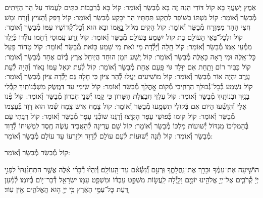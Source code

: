 \documentclass[twoside, openany, parskip=half, 11pt]{book}
\begin{document}
\begin{small}
אֹֽמֶץ יֶשְׁעֲךָ בָּא קוֹל דּוֹדִי הִנֵּה זֶה בָּא מְ֯בַשֵּׂר וְ֯אוֹמֵר:
קוֹל בָּא בְּ֯רִבֲבוֹת כִּתִּים לַעֲמוֹד עַל הַר הַזֵּיתִים מְ֯בַשֵּׂר וְ֯אוֹמֵר:
קוֹל גִּשְׁתּוֹ בַּשּׁוֹפָר לִתְקַע תַּחְתָּיו הַר יִבָּקַע מְ֯בַשֵּׂר וְ֯אוֹמֵר:
קוֹל דָּפַק וְ֯הֵצִיץ וְ֯זָרַח וּמָשׁ חֲצִי הָהָר מִמִּזְרָח מְ֯בַשֵּׂר וְ֯אוֹמֵר:
קוֹל הֵקִים מִלּוּל נׇׇׇׇאֳמוֹ וּבָא הוּא וְ֯כׇל־קְ֯דוֹשָׁיו עִמּוֹ מְ֯בַשֵּׂר וְ֯אוֹמֵר:
קוֹל וּלְכׇל־בָּאֵי הָעוֹלָם בַּת קוֹל יִשָּׁמַע בָּעוֹלָם מְ֯בַשֵּׂר וְ֯אוֹמֵר:
קוֹל זֶֽרַע עֲמוּסֵי רְ֯חָמוֹ נוֹלְ֯דוּ כְּ֯יֶֽלֶד מִמְּ֯עֵי אִמּוֹ מְ֯בַשֵּׂר וְ֯אוֹמֵר:
קוֹל חָֽלָה וְ֯יָלְ֯דָה מִי זֹאת מִי שָׁמַע כָּזֹאת מְ֯בַשֵּׂר וְ֯אוֹמֵר:
קוֹל טָהוֹר פָּעַל כׇּל־אֵֽלֶּה וּמִי רָאָה כָּאֵלֶּה מְ֯בַשֵּׂר וְ֯אוֹמֵר:
קוֹל יֶֽשַׁע וּזְמַן הוּחַד הֲיֽוּחַל אֶֽרֶץ בְּ֯יוֹם אֶחָד מְ֯בַשֵּׂר וְ֯אוֹמֵר:
קוֹל כַּבִּיר רוֹם וָתַֽחַת אִם יִוָּלֵד גּוֹי פַּֽעַם אֶחָת מְ֯בַשֵּׂר וְ֯אוֹמֵר:
קוֹל לְ֯עֵת יִגְאַל עַמּוֹ נָאוֹר וְ֯הָיָה לְ֯עֵת עֶֽרֶב יִהְיֶה אוֹר מְ֯בַשֵּׂר וְ֯אוֹמֵר:
קוֹל מוֹשִׁיעִים יַעֲלוּ לְ֯הַר צִיּוֹן כִּי חָלָה גַּם יָלְ֯דָה צִיּוֹן מְ֯בַשֵּׂר וְ֯אוֹמֵר:
קוֹל נִשְׁמַע בְּ֯כׇל־גְּ֯בוּלֵךְ הַרְחִֽיבִי מְ֯קוֹם אׇׇׇׇׇׇהֳלֵךְ מְ֯בַשֵּׂר וְ֯אוֹמֵר:
קוֹל שִֽׂימִי עַד דַּמֶּֽשֶׂק מִשְׁכְּ֯נוֹתַֽיִךְ קַבְּ֯לִי בָנַֽיִךְ וּבְנוֹתַֽיִךְ מְ֯בַשֵּׂר וְ֯אוֹמֵר:
קוֹל עִלְזִי חֲבַצֶּֽלֶת הַשָּׁרוֹן כִּי קָֽמוּ יְ֯שֵׁנֵי חֶבְרוֹן מְ֯בַשֵּׂר וְ֯אוֹמֵר:
קוֹל פְּ֯נוּ אֵלַי וְ֯הִוָּשְׁ֯עוּ הַיּוֹם אִם בְּ֯קוֹלִי תִשְׁמָֽעוּ מְ֯בַשֵּׂר וְ֯אוֹמֵר:
קוֹל צָמַח אִישׁ צֶֽמַח שְׁ֯מוֹ הוּא דָוִד בְּ֯עַצְמוֹ מְ֯בַשֵּׂר וְ֯אוֹמֵר:
קוֹל קֽוּמוּ כְּ֯פוּשֵׁי עָפָר הָקִֽיצוּ וְ֯רַנֲּנוּ שׁוֹכְ֯נֵי עָפָר מְ֯בַשֵּׂר וְ֯אוֹמֵר:
קוֹל רַבָּֽתִי עָם בְּ֯הַמְלִיכוֹ מִגְדּוֹל יְ֯שׁוּעוֹת מַלְכּוֹ מְ֯בַשֵּׂר וְ֯אוֹמֵר:
קוֹל שֵׁם עֲדִינָה לְ֯הַאֲבִיד עֹֽשֶׂה חֶֽסֶד לִמְשִׁיחוֹ לְ֯דָוִד מְ֯בַשֵּׂר וְ֯אוֹמֵר:
קוֹל תְּ֯נָה יְ֯שׁוּעוֹת לְ֯עַם עוֹלָם לְ֯דָוִד וּלְזַרְעוֹ עַד עוֹלָם מְ֯בַשֵּׂר וְ֯אוֹמֵר:

\end{small}

\begin{large}
קוֹל מְ֯בַשֵּׂר מְ֯בַשֵּׂר וְ֯אוֹמֵר:

\end{large}

הוֹשִׁ֤יעָה אֶת־עַמֶּ֗ךָ וּבָרֵ֥ךְ אֶת־נַֽחֲלָתֶ֑ךָ וּֽרְעֵ֥ם וְ֯֝נַשְּׂ֯אֵ֗ם עַד־הָֽעוֹלָֽם׃ וְ֯יִֽהְי֨וּ דְ֯בָרַ֜י אֵ֗לֶּה אֲשֶׁ֤ר הִתְחַנַּ֨נְתִּי֙ לִפְנֵ֣י יְיָ֔ קְ֯רֹבִ֛ים אֶל־יְיָ֥ אֱלֹהֵ֖ינוּ יוֹמָ֣ם וָלָ֑יְ֯לָה לַֽעֲשׂ֣וֹת מִשְׁפַּ֣ט עַבְדּ֗וֹ וּמִשְׁפַּ֛ט עַמּ֥וֹ יִשְׂרָאֵ֖ל דְּ֯בַר־י֥וֹם בְּ֯יוֹמֽוֹ׃ לְ֯מַ֗עַן דַּ֚עַת כׇּל־עַמֵּ֣י הָאָ֔רֶץ כִּ֥י יְיָ֖ ה֣וּא הָֽאֱלֹהִ֑ים אֵ֖ין עֽוֹד׃

\end{document}
